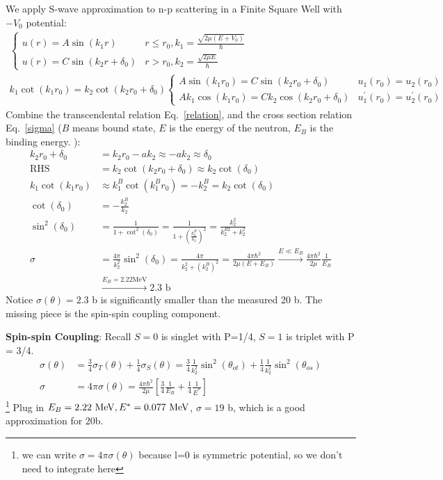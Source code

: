 \documentclass{school-22.101-notes}
\begin{document}
We apply S-wave approximation to n-p scattering in a Finite Square Well with $-V_0$ potential:
\begin{align}
\begin{cases}
u(r) = A \sin(k_1 r) & r \le r_0, k_1 = \frac{\sqrt{2 \mu (E+V_0)}}{\hbar} \\
u(r) = C \sin(k_2 r + \delta_0) & r > r_0, k_2 = \frac{\sqrt{2 \mu E}}{\hbar} 
\end{cases}
\\
\boxed{k_1 \cot (k_1 r_0) = k_2 \cot (k_2 r_0 + \delta_0) } \label{relation}
\begin{cases}
A \sin (k_1 r_0) = C \sin (k_2 r_0 + \delta_0) & u_1(r_0) = u_2(r_0) \\
A k_1 \cos (k_1 r_0) = C k_2 \cos (k_2 r_0 + \delta_0) & u^{\prime}_1 (r_0) = u_2^{\prime} (r_0) 
\end{cases}
\end{align}
Combine the transcendental relation Eq.~\ref{relation}, and the cross section relation Eq.~\ref{sigma} ($B$ means bound state, $E$ is the energy of the neutron, $E_B$ is the binding energy. ):
\begin{align}
k_2 r_0 + \delta_0 &= k_2 r_0 - ak_2 \approx -ak_2 \approx \delta_0 \\
\mathrm{RHS} &= k_2 \cot (k_2 r_0 + \delta_0) \approx k_2 \cot (\delta_0) \\
k_1 \cot (k_1 r_0) &\approx k_1^B \cot (k_1^B r_0) = - k_2^B  = k_2 \cot (\delta_0) \\
\cot (\delta_0) &= -\frac{k_2^B}{k_2} \\
\sin^2 (\delta_0) &= \frac{1}{1 + \cot^2 (\delta_0)} = \frac{1}{1 + \left( \frac{k_2^B}{k_2} \right)^2 } = \frac{k_2^2}{k_2^{B2} + k_2^2} \\
\sigma &= \frac{4\pi}{k_2^2} \sin^2 (\delta_0) = \frac{4\pi}{k_2^2 + \left(k_2^B \right)^2 } = \frac{4\pi \hbar^2}{2 \mu (E + E_B) } \xrightarrow{E \ll E_B} \frac{4 \pi \hbar^2}{2 \mu} \frac{1}{E_B} \\
&\xrightarrow{E_B = 2.22 \mathrm{ MeV}} 2.3 \mbox{ b} 
\end{align}
Notice $\sigma (\theta) = 2.3$ b is significantly smaller than the measured 20 b. The missing piece is the spin-spin coupling component.

\textbf{Spin-spin Coupling}: Recall $S=0$ is singlet with P=1/4, $S=1$ is triplet with P = 3/4. 
\begin{align}
\sigma( \theta) &= \frac{3}{4} \sigma_T (\theta) + \frac{1}{4} \sigma_S (\theta) = \frac{3}{4} \frac{1}{k_2^2} \sin^2 (\theta_{ot} ) + \frac{1}{4} \frac{1}{k_2^2} \sin^2 (\theta_{os} ) \\
\sigma &= 4 \pi \sigma (\theta) = \frac{4 \pi \hbar^2}{2 \mu} \left[ \frac{3}{4} \frac{1}{E_B} + \frac{1}{4} \frac{1}{E^*} \right] 
\end{align}\footnote{we can write $\sigma = 4 \pi \sigma(\theta)$ because l=0 is symmetric potential, so we don't need to integrate here} 
Plug in $E_B = 2.22 \mbox{ } \mathrm{MeV}, E^* = 0.077 \mbox{ } \mathrm{MeV}$, $\sigma = 19$ b, which is a good approximation for 20b. 
\end{document}

